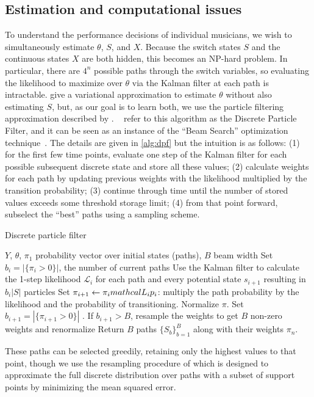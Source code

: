 \documentclass[aoas]{imsart}
\begin{document}
\subsection{Estimation and computational issues}
\label{sec:computational-issues}

To understand the performance decisions of individual musicians, we
wish to simultaneously estimate $\theta$, $S$, and $X$. Because the
switch states $S$ and the continuous states $X$ are both hidden, this becomes
an NP-hard problem. In particular, there are $4^n$ possible paths
through the switch variables, so evaluating the likelihood to maximize
over $\theta$ via the Kalman filter at each path is intractable. 
\citet{GhahramaniHinton2000} give a variational approximation to
estimate $\theta$ without also estimating $S$, but, as our goal is to
learn both, we use the particle filtering approximation described by
\citet{FearnheadClifford2003}. ~\cite{WhiteleyAndrieu2010} refer to
this algorithm as the Discrete Particle Filter, and it can be seen as
an instance of the ``Beam Search'' optimization
technique~\citep{Bisiani1992}. The details are given in
\autoref{alg:dpf} but the intuition is as follows: (1) for the first
few time points, evaluate
one step of the Kalman filter for each possible subsequent discrete
state and store all these values; (2) calculate weights for each path
by updating previous weights with the likelihood multiplied by the transition probability;
(3) continue through time until the number of stored values exceeds
some threshold storage limit; (4) from that point forward, subselect
the ``best'' paths using a sampling scheme.
\begin{algorithm}[t!]
  \caption{Discrete particle filter\label{alg:dpf}}
  \begin{algorithmic}[1]
  $Y$, $\theta$, $\pi_1$ probability vector over initial states
  (paths), $B$ beam width
  \STATE Set $b_i=|\{\pi_i>0\}|$, the number of current paths
  \STATE Use %
  the Kalman filter to calculate the 1-step likelihood
  $\mathcal{L}_i$ for each path and every potential state $s_{i+1}$ resulting in $b_i|S|$ particles
  \STATE Set $\pi_{i+1} \leftarrow \pi_i\\mathcal{L}_i p_i$: multiply the path
  probability by the likelihood and the probability of
  transitioning. Normalize $\pi$.
  \STATE Set $b_{i+1}=|\{\pi_{i+1}>0\}|$ . If $b_{i+1} > B$, resample the
  weights to get $B$ non-zero weights and renormalize
  \ENDFOR
  \STATE Return $B$ paths $\{S_b\}_{b=1}^B$ along with their weights $\pi_{n}$.
\end{algorithmic}
\end{algorithm}
These paths can be
selected greedily, retaining only the highest values to that point,
though we use the resampling procedure of
\citet{FearnheadClifford2003} which is designed to 
approximate the full discrete distribution over paths with a subset
of support points by minimizing the mean squared
error.
\end{document}
